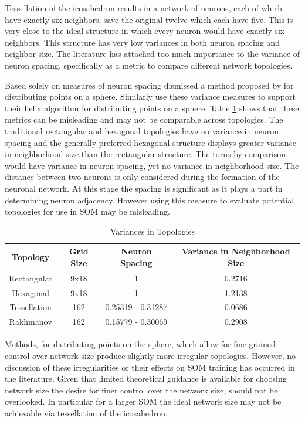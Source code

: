 \documentclass[11pt]{article}
\begin{document}
Tessellation of the icosahedron results in a network of neurons, each of which
have exactly six neighbors, save the original twelve which each have five.
This is very close to the ideal structure in which every neuron would have
exactly six neighbors.  This structure has very low variances in both neuron 
spacing and neighbor size.  The literature has attached too much importance 
to the variance of neuron spacing, specifically as a metric to compare different 
network topologies.  

Based solely on measures of neuron spacing \cite{wu2005} dismissed a method
proposed by \cite{Rakhmanov94} for distributing points on a sphere.  Similarly 
\cite{Nishio:2006fk} use these variance measures to support their helix algorithm 
for distributing points on a sphere.  Table \ref{table1} shows that these metrics can 
be misleading and may not be comparable across topologies.  The traditional 
rectangular and hexagonal topologies have no variance in neuron spacing and 
the generally preferred hexagonal structure displays greater variance in neighborhood
size than the rectangular structure.  The torus by comparison would have variance in 
neuron spacing, yet no variance in neighborhood size.  The distance between two 
neurons is only considered during the formation of the neuronal network.  At this stage
the spacing is significant as it plays a part in determining neuron adjacency. However 
using this measure to evaluate potential topologies for use in SOM may be misleading.

\begin{table}[htbp]
\caption{Variances in Topologies}
\begin{center}
\begin{tabular}{|c|c|c|c|}
\hline
Topology&Grid Size&Neuron Spacing&Variance in Neighborhood Size\\
\hline
Rectangular&9x18&1&0.2716\\
Hexagonal&9x18&1&1.2138\\
Tessellation&162&0.25319 - 0.31287& 0.0686\\
Rakhmanov&162&0.15779 - 0.30069& 0.2908\\
\hline

\end{tabular}
\end{center}
\label{table1}
\end{table}%

Methods, for distributing points on the sphere, which allow for fine grained
control over network size produce slightly more irregular topologies.  However,
no discussion of these irregularities or their effects on SOM training has
occurred in the literature. Given that limited theoretical guidance is available
for choosing network size the desire for finer control over the network size,
should not be overlooked. In particular for a larger SOM the ideal network size
may not be achievable via tessellation of the icosahedron.
\end{document}
